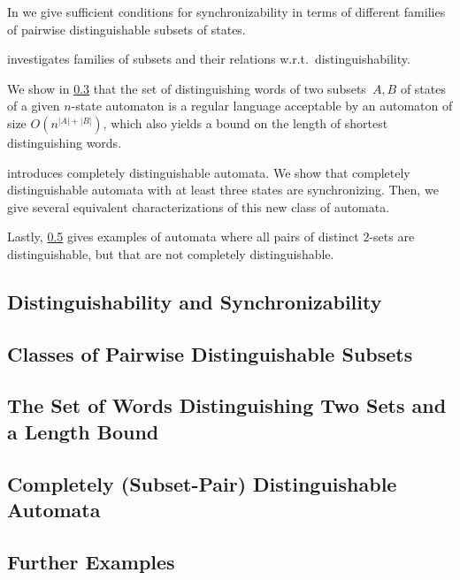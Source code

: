 
In 
we give sufficient conditions for synchronizability in terms of different families of pairwise distinguishable
subsets of states.

 investigates families of subsets 
and their relations w.r.t.~distinguishability.

We show in \cref{sync_max:sec:shortestdist} that the set of distinguishing words of two subsets~$A,B$ 
of states of a given $n$-state automaton
is a regular language acceptable by an automaton of size $O(n^{|A|+|B|})$,
which also yields a bound on the length of shortest distinguishing words.

 introduces completely distinguishable automata.
We show that completely distinguishable automata with at least three states are synchronizing.
Then, we give several equivalent characterizations of this new class of automata.

Lastly, \cref{sync_max:sec:furtherexamples} gives examples of automata
where all pairs of distinct $2$-sets are distinguishable, but that are
not completely distinguishable.

\subsection{Distinguishability and Synchronizability}
\label{sync_max:sec:dist_small_sets}



\subsection{Classes of Pairwise Distinguishable Subsets}
\label{sync_max:sec:pairs_k_k-1} 



\subsection{The Set of Words Distinguishing Two Sets and a Length Bound} %
\label{sync_max:sec:shortestdist} 



\subsection{Completely (Subset-Pair) Distinguishable Automata}
\label{sync_max:sec:completel-dist} 



\subsection{Further Examples}
\label{sync_max:sec:furtherexamples} 

